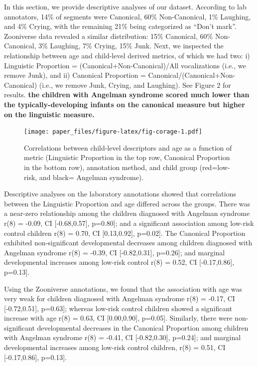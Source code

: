 \documentclass[english,,man]{apa6}
\begin{document}
In this section, we provide descriptive analyses of our dataset. According to lab annotators, 14\% of segments were Canonical, 60\% Non-Canonical, 1\% Laughing, and 4\% Crying, with the remaining 21\% being categorized as \enquote{Don't mark}. Zooniverse data revealed a similar distribution: 15\% Canonical, 60\% Non-Canonical, 3\% Laughing, 7\% Crying, 15\% Junk.
Next, we inspected the relationship between age and child-level derived metrics, of which we had two: i) Linguistic Proportion = (Canonical+Non-Canonical)/All vocalizations (i.e., we remove Junk), and ii) Canonical Proportion = Canonical/(Canonical+Non-Canonical) (i.e., we remove Junk, Crying, and Laughing). See Figure 2 for results. \textbf{the children with Angelman syndrome scored much lower than the typically-developing infants on the canonical measure but higher on the linguistic measure.}

\begin{figure}
\centering
\texttt{[image: paper\_files/figure-latex/fig-corage-1.pdf]}
\caption{\label{fig:fig-corage}Correlations between child-level descriptors and age as a function of metric (Linguistic Proportion in the top row, Canonical Proportion in the bottom row), annotation method, and child group (red=low-risk, and black= Angelman syndrome).}
\end{figure}

Descriptive analyses on the laboratory annotations showed that correlations between the Linguistic Proportion and age differed across the groups. There was a near-zero relationship among the children diagnosed with Angelman syndrome r(8) = -0.09, CI {[}-0.68,0.57{]}, p=0.80{]}; and a significant association among low-risk control children r(8) = 0.70, CI {[}0.13,0.92{]}, p=0.02{]}. The Canonical Proportion exhibited non-significant developmental decreases among children diagnosed with Angelman syndrome r(8) = -0.39, CI {[}-0.82,0.31{]}, p=0.26{]}; and marginal developmental increases among low-risk control r(8) = 0.52, CI {[}-0.17,0.86{]}, p=0.13{]}.

Using the Zooniverse annotations, we found that the association with age was very weak for children diagnosed with Angelman syndrome r(8) = -0.17, CI {[}-0.72,0.51{]}, p=0.63{]}; whereas low-risk control children showed a significant increase with age r(8) = 0.63, CI {[}0.00,0.90{]}, p=0.05{]}. Similarly, there were non-significant developmental decreases in the Canonical Proportion among children with Angelman syndrome r(8) = -0.41, CI {[}-0.82,0.30{]}, p=0.24{]}; and marginal developmental increases among low-risk control children, r(8) = 0.51, CI {[}-0.17,0.86{]}, p=0.13{]}.
\end{document}
